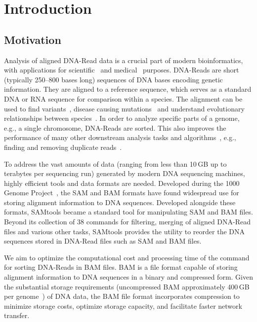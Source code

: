 \section{Introduction}

\subsection{Motivation}
Analysis of aligned DNA-Read data is a crucial part of modern bioinformatics, with applications for scientific~\cite{derrien_fast_2012,kumar_snp_2016,logsdon_long-read_2020} and medical~\cite{lang_identification_2022,chen_personal_2012,yang_transmission_2017} purposes. DNA-Reads are short (typically 250–800 bases long) sequences of DNA bases encoding genetic information. They are aligned to a reference sequence, which serves as a standard DNA or RNA sequence for comparison within a species. The alignment can be used to find variants~\cite{tamura_virological_2023,pabinger_survey_2014,audano_characterizing_2019}, disease causing mutations~\cite{meyerson_advances_2010,he_comprehensive_2021,kim_cross-species_2020} and understand evolutionary relationships between species~\cite{mccormack_applications_2013,sexton_homology-based_2016,branstetter_enriching_2017}. In order to analyze specific parts of a genome, e.g., a single chromosome, DNA-Reads are sorted. This also improves the performance of many other downstream analysis tasks and algorithms~\cite{neph_bedops_2012,li_tabix_2011}, e.g., finding and removing duplicate reads~\cite{chen_gencore_2019,noauthor_samtools-markdup1_nodate}. 

To address the vast amounts of data (ranging from less than 10\,GB up to terabytes per sequencing run) generated by modern DNA sequencing machines, highly efficient tools and data formats are needed. Developed during the 1000 Genome Project~\cite{the_1000_genomes_project_consortium_1000_2012}, the SAM and BAM formats have found widespread use for storing alignment information to DNA sequences. Developed alongside these formats, SAMtools became a standard tool for manipulating SAM and BAM files. Beyond its collection of 38 commands for filtering, merging of aligned DNA-Read files and various other tasks, SAMtools provides the  \sort utility to reorder the DNA sequences stored in DNA-Read files such as SAM and BAM files. 

We aim to optimize the computational cost and processing time of the \sort command for sorting DNA-Reads in BAM files. BAM is a file format capable of storing alignment information to DNA sequences in a binary and compressed form. Given the substantial storage requirements (uncompressed BAM approximately 400\,GB per genome~\cite{noauthor_storage_2011}) of DNA data, the BAM file format incorporates compression to minimize storage costs, optimize storage capacity, and facilitate faster network transfer.

